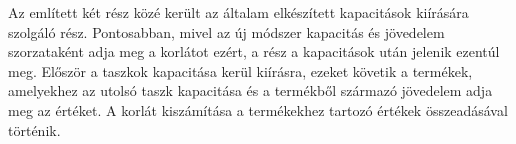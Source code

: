 Az említett két rész közé került az általam elkészített kapacitások kiírására szolgáló rész. Pontosabban, mivel az új módszer kapacitás és jövedelem szorzataként adja meg a korlátot ezért, a rész a kapacitások után jelenik ezentúl meg. Először a taszkok kapacitása kerül kiírásra, ezeket követik a termékek, amelyekhez az utolsó taszk kapacitása és a termékből származó jövedelem adja meg az értéket. A korlát kiszámítása a termékekhez tartozó értékek összeadásával történik.